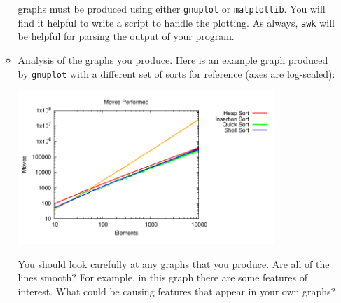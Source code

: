 \begin{enumerate}
\begin{itemize}
        graphs must be produced using either \texttt{gnuplot} or
        \texttt{matplotlib}. You will find it helpful to write a script to
        handle the plotting. As always, \texttt{awk} will be helpful for parsing
        the output of your program.
      \item Analysis of the graphs you produce. Here is an example graph
        produced by \texttt{gnuplot} with a different set of sorts for reference
        (axes are log-scaled):
        \begin{center}
          \includegraphics[width=0.8\textwidth]{images/moves.pdf} \\
        \end{center}
        You should look carefully at any graphs that you produce. Are
        all of the lines smooth? For example, in this graph there are
        some features of interest. What could be causing features that
        appear in your own graphs?
    \end{itemize}
\end{enumerate}
